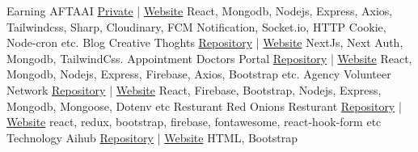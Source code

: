 \documentclass[9pt]{developercv} %
\begin{document}
\begin{entrylist}
    \entry
		{Earning}
		{AFTAAI}
		{\href{}{Private} | \href{https://www.aftaai.com}{Website}}
		{React, Mongodb, Nodejs, Express, Axios, Tailwindcss, Sharp, Cloudinary, FCM Notification, Socket.io, HTTP Cookie, Node-cron etc.}
  \entry
		{Blog}
		{Creative Thoghts}
		{\href{https://github.com/fs-nirjhor/creative-thoughts}{Repository} | \href{https://creative-thoughts-fsn.vercel.app}{Website}}
		{NextJs, Next Auth, Mongodb, TailwindCss.}
  \entry
		{Appointment}
		{Doctors Portal}
		{\href{https://github.com/fs-nirjhor/doctors-portal-fsn}{Repository} | \href{https://doctors-portal-fsn.netlify.app}{Website}}
		{React, Mongodb, Nodejs, Express, Firebase, Axios, Bootstrap etc.}
    \entry
		{Agency}
		{Volunteer Network}
		{\href{https://github.com/fs-nirjhor/volunteer-network-fsn}{Repository} | \href{https://volunteer-network-fsn.netlify.app/}{Website}}
		{React, Firebase, Bootstrap, Nodejs, Express, Mongodb, Mongoose, Dotenv etc}
	\entry
		{Resturant}
		{Red Onions Resturant}
		{\href{https://github.com/fs-nirjhor/red-onion-resturants-fsn}{Repository} | \href{https://red-onion-resturants-fsn.netlify.app}{Website}}
		{react, redux, bootstrap, firebase, fontawesome, react-hook-form etc}
    \entry
		{Technology}
		{Aihub}
		{\href{https://github.com/fs-nirjhor/aihub-fsn}{Repository} | \href{https://aihub-fsn.netlify.app}{Website}}
		{HTML, Bootstrap}
\end{entrylist}
\end{document}
